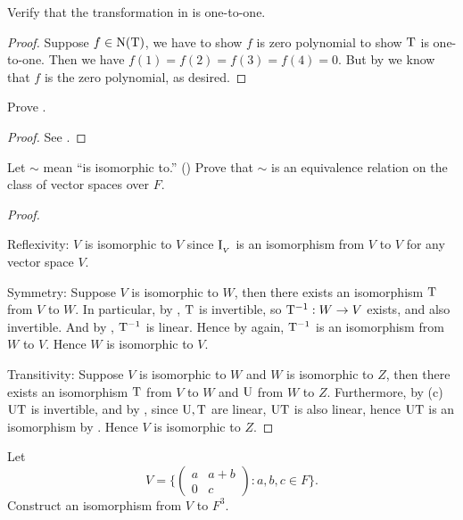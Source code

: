 \begin{exercise} \label{exercise 2.4.11}
Verify that the transformation in  is one-to-one.
\end{exercise}

\begin{proof}
Suppose \(f \in \mathrm{N(T)}\), we have to show \(f\) is zero polynomial to show \(\mathrm{T}\) is one-to-one.
Then we have \(f(1) = f(2) = f(3) = f(4) = 0\).
But by  we know that \(f\) is the zero polynomial, as desired.
\end{proof}

\begin{exercise} \label{exercise 2.4.12}
Prove .
\end{exercise}

\begin{proof}
See .
\end{proof}

\begin{exercise} \label{exercise 2.4.13}
Let \(\sim\) mean ``is isomorphic to.'' ()
Prove that \(\sim\) is an equivalence relation on the class of vector spaces over \(F\).
\end{exercise}

\begin{proof}\ 

Reflexivity: \(V\) is isomorphic to \(V\) since \(\mathrm{I}_{_V}\) is an isomorphism from \(V\) to \(V\) for any vector space \(V\).

Symmetry: Suppose \(V\) is isomorphic to \(W\), then there exists an isomorphism \(\mathrm{T}\) from \(V\) to \(W\).
In particular, by , \(\mathrm{T}\) is invertible, so \(\mathrm{T}^{-1} : W \to V\) exists, and also invertible.
And by , \(\mathrm{T}^{-1}\) is linear.
Hence by  again, \(\mathrm{T}^{-1}\) is an isomorphism from \(W\) to \(V\).
Hence \(W\) is isomorphic to \(V\).

Transitivity: Suppose \(V\) is isomorphic to \(W\) and \(W\) is isomorphic to \(Z\), then there exists an isomorphism \(\mathrm{T}\) from \(V\) to \(W\) and \(\mathrm{U}\) from \(W\) to \(Z\).
Furthermore, by (c) \(\mathrm{U}\mathrm{T}\) is invertible, and by , since \(\mathrm{U}, \mathrm{T}\) are linear, \(\mathrm{U}\mathrm{T}\) is also linear, hence \(\mathrm{U}\mathrm{T}\) is an isomorphism by .
Hence \(V\) is isomorphic to \(Z\).
\end{proof}

\begin{exercise} \label{exercise 2.4.14}
Let
\[
    V = \bigg\{ \begin{pmatrix} a & a + b \\ 0 & c \end{pmatrix} : a, b, c \in F \bigg\}.
\]
Construct an isomorphism from \(V\) to \(F^3\).
\end{exercise}

